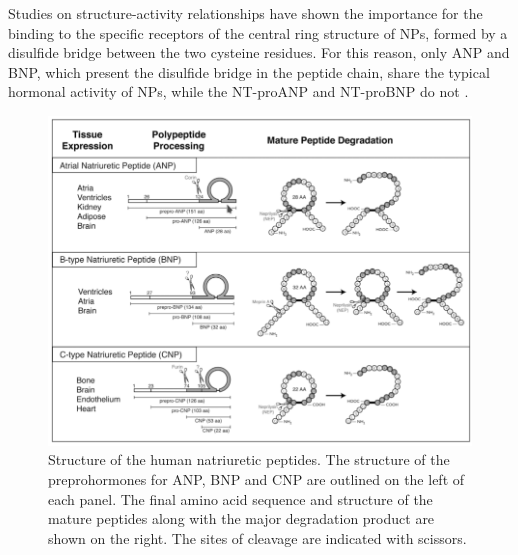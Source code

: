 \documentclass[14pt,a4paper,onecolumn]{extarticle}
\begin{document}
Studies on structure-activity relationships have shown the importance for the binding to the specific receptors of the central ring structure of NPs, formed by a disulfide bridge between the two cysteine  residues. For this reason, only ANP and BNP, which present the disulfide bridge in the peptide chain, share the typical hormonal activity of NPs, while the NT-proANP and NT-proBNP do not \citep{bib35} \citep{bib36} \citep{bib37}. %



\begin{figure}      \centering      \includegraphics[scale=0.4]{../../images/NP_structure.png}      \caption{Structure of the human natriuretic peptides. The structure of the preprohormones for ANP, BNP and CNP are outlined on the left of each panel. The final amino acid sequence and structure of the mature peptides along with the major degradation product are shown on the right. The sites of cleavage are indicated with scissors.}      \label{NP_structure}  \end{figure} %
\end{document}
